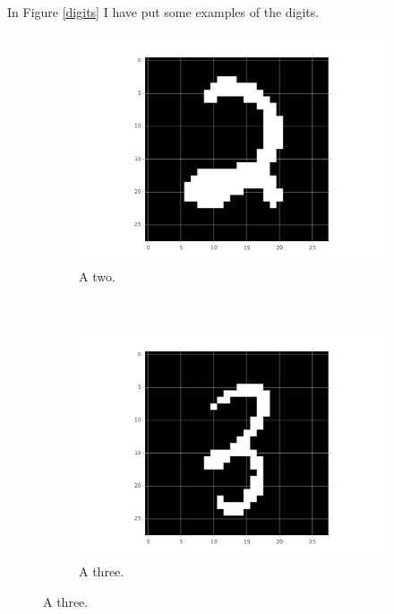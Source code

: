 \documentclass[paper=a4, fontsize=10pt]{scrartcl} %
\numberwithin{equation}{section} %
\numberwithin{figure}{section} %
\numberwithin{table}{section} %
\begin{document}
In Figure \ref{digits} I have put some examples of the digits.

\begin{figure}[H]
	\centering
	\begin{subfigure}[b]{0.3\textwidth}
                \includegraphics[width=\textwidth]{two}
                \caption{A two.}
        \end{subfigure}%
        ~ %
        \begin{subfigure}[b]{0.3\textwidth}
                \includegraphics[width=\textwidth]{three}
                \caption{A three.}
        \end{subfigure}

\end{figure}
\end{document}
